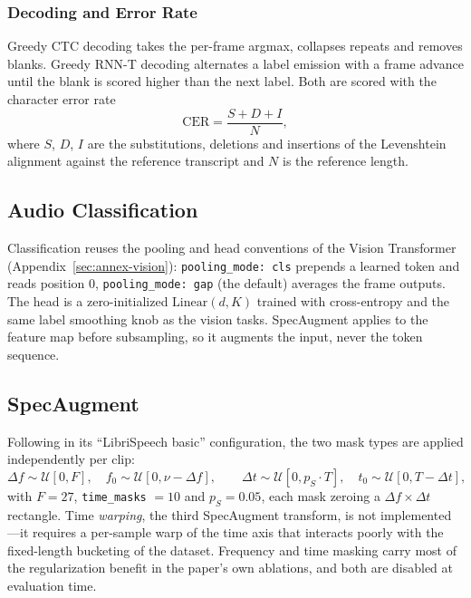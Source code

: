 \subsubsection{Decoding and Error Rate}

Greedy CTC decoding takes the per-frame argmax, collapses repeats and removes blanks. Greedy RNN-T decoding alternates a label emission with a frame advance until the blank is scored higher than the next label. Both are scored with the character error rate
\begin{equation}
\mathrm{CER} = \frac{S + D + I}{N},
\label{eq:audio-cer}
\end{equation}
where $S$, $D$, $I$ are the substitutions, deletions and insertions of the Levenshtein alignment against the reference transcript and $N$ is the reference length.

\subsection{Audio Classification}

Classification reuses the pooling and head conventions of the Vision Transformer (Appendix~\ref{sec:annex-vision}): \texttt{pooling\_mode: cls} prepends a learned token and reads position 0, \texttt{pooling\_mode: gap} (the default) averages the frame outputs. The head is a zero-initialized $\mathrm{Linear}(d, K)$ trained with cross-entropy and the same label smoothing knob as the vision tasks. SpecAugment applies to the feature map before subsampling, so it augments the input, never the token sequence.

\subsection{SpecAugment}

Following \citet{Park2019} in its ``LibriSpeech basic'' configuration, the two mask types are applied independently per clip:
\begin{equation}
\Delta f \sim \mathcal{U}[0, F], \quad f_0 \sim \mathcal{U}[0, \nu - \Delta f],
\qquad
\Delta t \sim \mathcal{U}[0, p_S \cdot T], \quad t_0 \sim \mathcal{U}[0, T - \Delta t],
\label{eq:audio-specaugment}
\end{equation}
with $F = 27$, \texttt{time\_masks} $= 10$ and $p_S = 0.05$, each mask zeroing a $\Delta f \times \Delta t$ rectangle. Time \emph{warping}, the third SpecAugment transform, is not implemented---it requires a per-sample warp of the time axis that interacts poorly with the fixed-length bucketing of the dataset. Frequency and time masking carry most of the regularization benefit in the paper's own ablations, and both are disabled at evaluation time.

